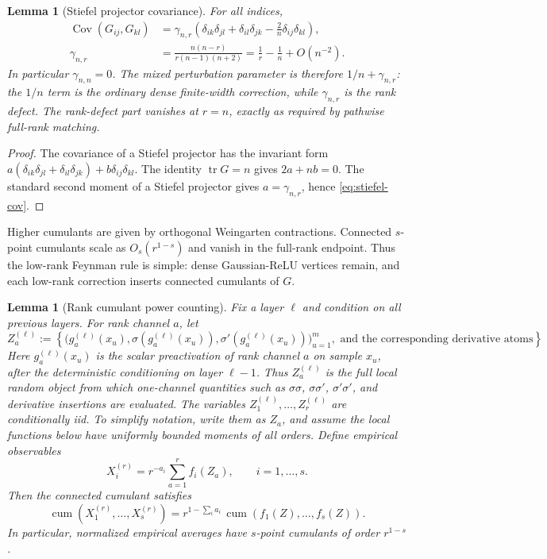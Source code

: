 \documentclass{article}
\newtheorem{lemma}[theorem]{Lemma}
\newcommand{\Cov}{\operatorname{Cov}}
\newcommand{\cumul}{\operatorname{cum}}
\newcommand{\tr}{\operatorname{tr}}
\begin{document}
\begin{lemma}[Stiefel projector covariance]
\label{lem:stiefel-cov}
For all indices,
\begin{equation}
\begin{aligned}
\Cov(G_{ij},G_{kl})
&=\gamma_{n,r}\left(\delta_{ik}\delta_{jl}+\delta_{il}\delta_{jk}
-\frac2n\delta_{ij}\delta_{kl}\right),\\
\gamma_{n,r}
&=\frac{n(n-r)}{r(n-1)(n+2)}
=\frac1r-\frac1n+O(n^{-2}).
\end{aligned}
\label{eq:stiefel-cov}
\end{equation}
In particular \(\gamma_{n,n}=0\). The mixed perturbation parameter is therefore \(1/n+\gamma_{n,r}\): the \(1/n\) term is the ordinary dense finite-width correction, while \(\gamma_{n,r}\) is the rank defect. The rank-defect part vanishes at \(r=n\), exactly as required by pathwise full-rank matching.
\end{lemma}

\begin{proof}
The covariance of a Stiefel projector has the invariant form \(a(\delta_{ik}\delta_{jl}+\delta_{il}\delta_{jk})+b\delta_{ij}\delta_{kl}\). The identity \(\tr G=n\) gives \(2a+nb=0\). The standard second moment of a Stiefel projector gives \(a=\gamma_{n,r}\), hence \eqref{eq:stiefel-cov}.
\end{proof}

Higher cumulants are given by orthogonal Weingarten contractions. Connected \(s\)-point cumulants scale as \(O_s(r^{1-s})\) and vanish in the full-rank endpoint. Thus the low-rank Feynman rule is simple: dense Gaussian-ReLU vertices remain, and each low-rank correction inserts connected cumulants of \(G\).

\iffalse
\begin{lemma}[Rank cumulant power counting]
\label{lem:rank-cumulant-counting}
Fix a layer \(\ell\) and condition on all previous layers. For rank channel \(a\), let
\[
Z_a^{(\ell)}
:=
\left\{
\bigl(g_a^{(\ell)}(x_u),\sigma(g_a^{(\ell)}(x_u)),\sigma'(g_a^{(\ell)}(x_u))\bigr)_{u=1}^{m},
\text{ and the corresponding derivative atoms}
\right\}.
\]
Here \(g_a^{(\ell)}(x_u)\) is the scalar preactivation of rank channel \(a\) on sample \(x_u\), after the deterministic conditioning on layer \(\ell-1\). Thus \(Z_a^{(\ell)}\) is the full local random object from which one-channel quantities such as \(\sigma\sigma\), \(\sigma\sigma'\), \(\sigma'\sigma'\), and derivative insertions are evaluated. The variables \(Z_1^{(\ell)},\ldots,Z_r^{(\ell)}\) are conditionally iid. To simplify notation, write them as \(Z_a\), and assume the local functions below have uniformly bounded moments of all orders. Define empirical observables
\[
X_i^{(r)}=r^{-a_i}\sum_{a=1}^{r} f_i(Z_a),
\qquad i=1,\ldots,s.
\]
Then the connected cumulant satisfies
\begin{equation}
\cumul\left(X_1^{(r)},\ldots,X_s^{(r)}\right)
=r^{1-\sum_i a_i}\,
\cumul\left(f_1(Z),\ldots,f_s(Z)\right).
\label{eq:rank-cumulant-counting}
\end{equation}
In particular, normalized empirical averages have \(s\)-point cumulants of order \(r^{1-s}\).
\end{lemma}
\end{document}
